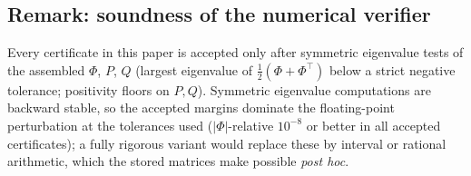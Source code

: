 \documentclass[preprint,12pt]{elsarticle}
\begin{document}
\subsection{Remark: soundness of the numerical verifier}

Every certificate in this paper is accepted only after symmetric
eigenvalue tests of the assembled $\Phi$, $P$, $Q$ (largest eigenvalue
of $\tfrac12(\Phi + \Phi^{\!\top})$ below a strict negative tolerance;
positivity floors on $P, Q$).  Symmetric eigenvalue computations are
backward stable, so the accepted margins dominate the floating-point
perturbation at the tolerances used ($|\Phi|$-relative
$10^{-8}$ or better in all accepted certificates); a fully rigorous
variant would replace these by interval or rational arithmetic, which
the stored matrices make possible \emph{post hoc}.
\end{document}
